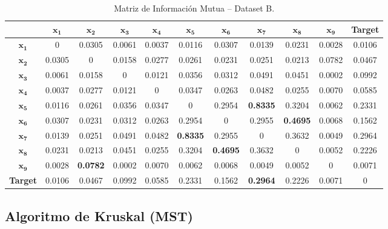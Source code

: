 \documentclass[12pt,a4paper]{article}
\begin{document}
\begin{table}[H]
    \centering
    \footnotesize
    \begin{tabular}{c|cccccccccc}
        \toprule
        & $\mathbf{x_1}$ & $\mathbf{x_2}$ & $\mathbf{x_3}$ & $\mathbf{x_4}$ & $\mathbf{x_5}$ & $\mathbf{x_6}$ & $\mathbf{x_7}$ & $\mathbf{x_8}$ & $\mathbf{x_9}$ & \textbf{Target} \\
        \midrule
        $\mathbf{x_1}$ & 0 & 0.0305 & 0.0061 & 0.0037 & 0.0116 & 0.0307 & 0.0139 & 0.0231 & 0.0028 & 0.0106 \\
        $\mathbf{x_2}$ & 0.0305 & 0 & 0.0158 & 0.0277 & 0.0261 & 0.0231 & 0.0251 & 0.0213 & 0.0782 & 0.0467 \\
        $\mathbf{x_3}$ & 0.0061 & 0.0158 & 0 & 0.0121 & 0.0356 & 0.0312 & 0.0491 & 0.0451 & 0.0002 & 0.0992 \\
        $\mathbf{x_4}$ & 0.0037 & 0.0277 & 0.0121 & 0 & 0.0347 & 0.0263 & 0.0482 & 0.0255 & 0.0070 & 0.0585 \\
        $\mathbf{x_5}$ & 0.0116 & 0.0261 & 0.0356 & 0.0347 & 0 & 0.2954 & \textbf{0.8335} & 0.3204 & 0.0062 & 0.2331 \\
        $\mathbf{x_6}$ & 0.0307 & 0.0231 & 0.0312 & 0.0263 & 0.2954 & 0 & 0.2955 & \textbf{0.4695} & 0.0068 & 0.1562 \\
        $\mathbf{x_7}$ & 0.0139 & 0.0251 & 0.0491 & 0.0482 & \textbf{0.8335} & 0.2955 & 0 & 0.3632 & 0.0049 & 0.2964 \\
        $\mathbf{x_8}$ & 0.0231 & 0.0213 & 0.0451 & 0.0255 & 0.3204 & \textbf{0.4695} & 0.3632 & 0 & 0.0052 & 0.2226 \\
        $\mathbf{x_9}$ & 0.0028 & \textbf{0.0782} & 0.0002 & 0.0070 & 0.0062 & 0.0068 & 0.0049 & 0.0052 & 0 & 0.0071 \\
        \textbf{Target} & 0.0106 & 0.0467 & 0.0992 & 0.0585 & 0.2331 & 0.1562 & \textbf{0.2964} & 0.2226 & 0.0071 & 0 \\
        \bottomrule
    \end{tabular}
    \caption{Matriz de Información Mutua -- Dataset B.}
\end{table}

\subsection{Algoritmo de Kruskal (MST)}
\end{document}
